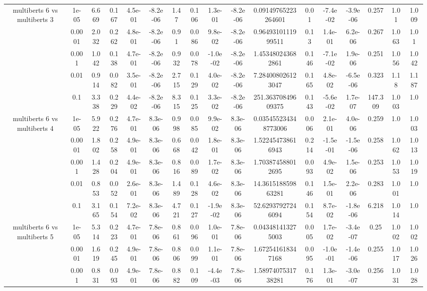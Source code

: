 \begin{tabular}{|c|c|c|c|c|c|c|c|c|c|c|c|c|c|c|c|c|}
\hline
\multirow{5}{*}{multiberts 6 vs multiberts 3} & 1e-05 & 6.669 & 0.167 & 4.5e-01 & -8.2e-06 & 1.47 & 0.106 & 1.3e-01 & -8.2e-06 & 0.09149765223264601 & 0.01 & -7.4e-02 & -3.9e-06 & 0.257 & 1.01 & 1.009 \\
 & 0.0001 & 2.032 & 0.262 & 4.8e-01 & -8.2e-06 & 0.91 & 0.086 & 9.8e-02 & -8.2e-06 & 0.9649310111999511 & 0.13 & 1.4e-01 & 6.2e-06 & 0.267 & 1.063 & 1.01 \\
 & 0.001 & 1.042 & 0.138 & 4.7e-01 & -8.2e-06 & 0.932 & 0.078 & -1.0e-02 & -8.2e-06 & 1.453480243682861 & 0.146 & -7.1e-02 & 1.9e-06 & 0.251 & 1.056 & 1.042 \\
 & 0.01 & 0.914 & 0.082 & 3.5e-01 & -8.2e-06 & 2.715 & 0.129 & 4.0e-02 & -8.2e-06 & 7.284008026123047 & 0.165 & 4.8e-02 & -6.5e-06 & 0.323 & 1.18 & 1.187 \\
 & 0.1 & 3.338 & 0.229 & 4.4e-02 & -8.2e-06 & 8.315 & 0.125 & 3.3e-02 & -8.2e-06 & 251.36370849609375 & 0.143 & -5.6e-02 & 1.7e-07 & 147.309 & 1.003 & 1.0 \\
\hline
\multirow{5}{*}{multiberts 6 vs multiberts 4} & 1e-05 & 5.922 & 0.276 & 4.7e-01 & 8.3e-06 & 0.998 & 0.085 & 9.9e-02 & 8.3e-06 & 0.035455234348773006 & 0.006 & 2.1e-01 & 4.0e-06 & 0.259 & 1.0 & 1.003 \\
 & 0.0001 & 1.802 & 0.258 & 4.9e-01 & 8.3e-06 & 0.668 & 0.042 & 1.8e-01 & 8.3e-06 & 1.522454738616943 & 0.214 & -1.5e-01 & -1.5e-06 & 0.258 & 1.062 & 1.013 \\
 & 0.001 & 1.428 & 0.204 & 4.9e-01 & 8.3e-06 & 0.816 & 0.089 & 1.7e-02 & 8.3e-06 & 1.703874588012695 & 0.093 & 4.9e-02 & 1.5e-06 & 0.253 & 1.053 & 1.019 \\
 & 0.01 & 0.853 & 0.052 & 2.6e-01 & 8.3e-06 & 1.489 & 0.128 & 4.6e-02 & 8.3e-06 & 14.361518859863281 & 0.146 & 1.5e-01 & 2.2e-06 & 0.283 & 1.001 & 1.0 \\
 & 0.1 & 3.165 & 0.154 & 7.2e-02 & 8.3e-06 & 4.721 & 0.127 & -1.9e-02 & 8.3e-06 & 52.62937927246094 & 0.154 & 8.7e-02 & -1.8e-06 & 6.218 & 1.014 & 1.0 \\
\hline
\multirow{5}{*}{multiberts 6 vs multiberts 5} & 1e-05 & 5.314 & 0.223 & 4.7e-01 & 7.8e-06 & 0.861 & 0.096 & 1.0e-01 & 7.8e-06 & 0.043481413275003 & 0.005 & 1.7e-02 & -3.4e-07 & 0.25 & 1.002 & 1.002 \\
 & 0.0001 & 1.619 & 0.245 & 4.9e-01 & 7.8e-06 & 0.806 & 0.099 & 1.1e-01 & 7.8e-06 & 1.672541618347168 & 0.095 & -1.0e-01 & -1.4e-06 & 0.255 & 1.017 & 1.026 \\
 & 0.001 & 0.831 & 0.093 & 4.9e-01 & 7.8e-06 & 0.882 & 0.109 & -4.4e-03 & 7.8e-06 & 1.5897407531738281 & 0.176 & 1.3e-01 & -3.0e-07 & 0.256 & 1.031 & 1.028 \\

\end{tabular}
